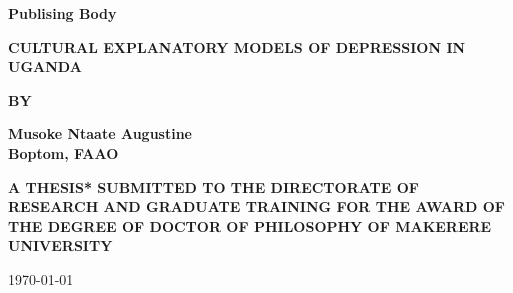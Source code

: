 
\begin{titlepage}
    \begin{center}
        \vspace*{1in}
        \Huge
        \textbf{Publising Body}


        \vspace{0.5in}
        \LARGE
        \textbf{CULTURAL EXPLANATORY MODELS OF DEPRESSION IN UGANDA}
            
        \vspace{0.7in}
        \LARGE
        \textbf{BY}
            
        \vspace{0.7in}
            
        \textbf{Musoke Ntaate Augustine\\
        Boptom, FAAO}
            
        \vspace{1.2in}
        \LARGE
        \textbf{A THESIS* SUBMITTED TO THE
        DIRECTORATE OF RESEARCH AND GRADUATE TRAINING
        FOR THE AWARD OF THE DEGREE OF DOCTOR OF
        PHILOSOPHY OF MAKERERE UNIVERSITY}
        
            
        \vspace{0.3in}
            

        
        \Large
        \today
            
        \vspace{1.1in}

    \end{center}
\end{titlepage}
    